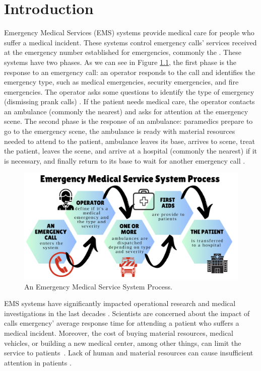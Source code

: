 \chapter{Introduction}

Emergency Medical Services (EMS) systems provide medical care for people who suffer a medical incident. These systems control emergency calls' services received at the emergency number established for emergencies, commonly the  . These systems have two phases. As we can see in Figure \ref{fig:ems}, the first phase is the response to an emergency call: an operator responds to the call and identifies the emergency type, such as medical emergencies, security emergencies, and fire emergencies. The operator asks some questions to identify the type of emergency (dismissing prank calls) \cite{911_Unk}. If the patient needs medical care, the operator contacts an ambulance (commonly the nearest) and asks for attention at the emergency scene. The second phase is the response of an ambulance: paramedics prepare to go to the emergency scene, the ambulance is ready with material resources needed to attend to the patient, ambulance leaves its base, arrives to scene, treat the patient, leaves the scene, and arrive at a hospital (commonly the nearest) if it is necessary, and finally return to its base to wait for another emergency call \cite{neil2023}.

\begin{figure}[htb]
    \centering
    \includegraphics[width=0.82\linewidth]{EMS_System.png}
    \caption{An Emergency Medical Service System Process.}
    \label{fig:ems}
\end{figure}

EMS systems have significantly impacted operational research and medical investigations in the last decades \cite{ball1993reliability, olave2021modeling, aboueljinane2013review}. Scientists are concerned about the impact of calls emergency' average response time for attending a patient who suffers a medical incident. Moreover, the cost of buying material resources, medical vehicles, or building a new medical center, among other things, can limit the service to patients~\cite{hulshof2012taxonomic}. Lack of human and material resources can cause insufficient attention in patients \cite{kabene2006importance, ahlenius2017patients, garcia2018patient}.

